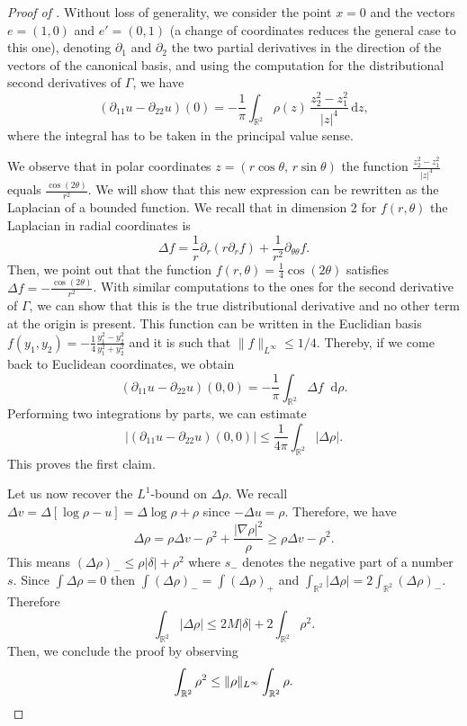 \documentclass[11pt,a4paper]{article}
\numberwithin{equation}{section}
\newcommand{\R}{{\mathbb{R}}}
\theoremstyle{plain}
\theoremstyle{remark}
\newcommand {\f}{\frac}
\newcommand{\diff}{\mathop{}\!\mathrm{d}}
\begin{document}
\begin{proof}[Proof of ]
Without loss of generality, we consider the point $x=0$ and the vectors $e=(1,0)$ and $e'=(0,1)$  (a change of coordinates reduces the general case to this one), 
denoting $\partial_1$ and $\partial_2$ the two partial derivatives in the direction of the vectors of the canonical basis, and using the computation for the distributional second derivatives of $\Gamma$, we have  
\[
(\partial_{11}u-\partial_{22}u)(0)
 = 
-\f{1}{\pi}
\int_{\mathbb{R}^2}\rho(z)\,\f{z_2^2 - z_1^2}{|z|^4}\,\mathrm{d}z,
\]
where the integral has to be taken in the principal value sense.

We observe that in polar coordinates $z=(r\cos\theta,\,r\sin\theta)$ the function  $\f{z_2^2 - z_1^2}{|z|^4}$ equals $\f{\cos(2\theta) }{r^2}$. 
%
We will show that this new expression can be rewritten as the Laplacian of a bounded function. We recall that in dimension 2 for $f(r,\theta)$ the Laplacian in radial coordinates is
$$
\Delta f= \f{1}{r}\partial_{r}(r\partial_{r}f) + \f{1}
{r^2}\partial_{\theta\theta}f.$$
Then, we point out that the function $f(r,\theta)= \f{1}{4}\cos(2\theta)$ satisfies $\Delta f = -\f{\cos(2\theta)}{r^2}$. With similar computations to the ones for the second derivative of $\Gamma$, we can show that this is the true distributional derivative and no other term at the origin is present. This function can be written in the Euclidian basis $f(y_1,y_2) = -\f{1}{4}\f{y_1^2-y_2^2}{y_1^2+y_2^2}$ and it is such that $\|f\|_{L^{\infty}}\le 1/4.$
Thereby, if we come back to Euclidean coordinates, we obtain 
$$
    (\partial_{11}u-\partial_{22}u)(0,0) = -\f{1}{\pi}\int_{\R^2}\Delta f\diff \rho.
$$
Performing two integrations by parts, we can estimate 
$$
|(\partial_{11}u-\partial_{22}u)(0,0)|\le \f{1}{4\pi}\int_{\R^2}|\Delta\rho|.
$$
This proves the first claim. 

Let us now recover the $L^1$-bound on $\Delta\rho$.
We recall $\Delta v = \Delta[\log\rho-u]= \Delta\log\rho + \rho$ since $-\Delta u =\rho$. Therefore, we have
$$
    \Delta\rho = \rho\Delta v -\rho^2 +\f{|\nabla\rho|^2}{\rho}\ge \rho\Delta v - \rho^2.
$$
This means $(\Delta\rho)_{-}\le \rho|\delta|+\rho^2$ where $s_{-}$ denotes the negative part of a number $s$. Since $\int \Delta\rho=0$ then $\int (\Delta\rho)_{-} = \int (\Delta\rho)_{+} $ and
$
\int_{\R^2} |\Delta\rho |= 2\int_{\R^2} (\Delta\rho)_{-}$. Therefore 
$$
    \int_{\R^2} |\Delta\rho| \le 2M |\delta| + 2\int_{\R^2}\rho^2.
$$
Then, we conclude the proof by observing
\begin{equation*}
    \int_{\R^2}\rho^2\le \|\rho\|_{L^{\infty}}\int_{\R^2}\rho. \qedhere
\end{equation*}
\end{proof}
\end{document}
